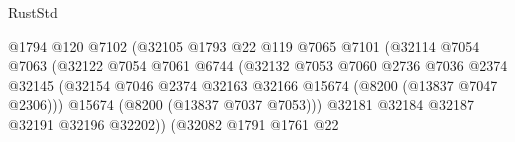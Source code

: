 \begin{lexlean}{RustStd}
\begin{coremodule}
                                                  @1794
                                                  @120
                                                  @7102
                                                  (@32105
                                                    @1793
                                                    @22
                                                    @119
                                                    @7065
                                                    @7101
                                                    (@32114
                                                      @7054
                                                      @7063
                                                      (@32122
                                                        @7054
                                                        @7061
                                                        @6744
                                                        (@32132
                                                          @7053
                                                          @7060
                                                          @2736
                                                          @7036
                                                          @2374
                                                          @32145
                                                          (@32154
                                                            @7046
                                                            @2374
                                                            @32163
                                                            @32166
                                                            @15674
                                                            (@8200 (@13837 @7047 @2306)))
                                                          @15674
                                                          (@8200 (@13837 @7037 @7053)))
                                                        @32181
                                                        @32184
                                                        @32187
                                                        @32191
                                                        @32196
                                                        @32202))
                                                    (@32082
                                                      @1791
                                                      @1761
                                                      @22

\end{coremodule}
\end{lexlean}

